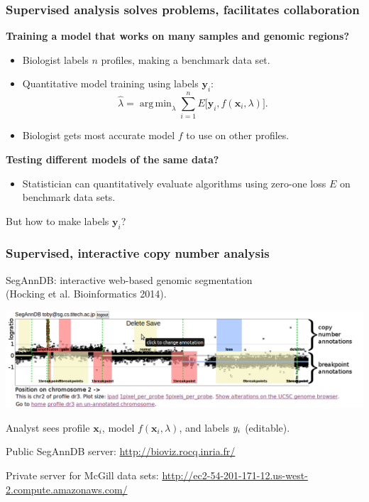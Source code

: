\documentclass{beamer}
\DeclareMathOperator*{\argmin}{arg\,min}
\begin{document}
\begin{frame}
  \frametitle{Supervised analysis solves problems, facilitates
    collaboration}
  \textbf{Training a model that works on many samples and genomic
    regions?} 
  \begin{itemize}
  \item Biologist labels $n$ profiles, making a benchmark data set.
  \item Quantitative model training using labels $\mathbf y_i$:
  \begin{equation*}
    \hat \lambda = \argmin_{\lambda}
    \sum_{i=1}^n
    E\big[
      \mathbf y_i,
      f(\mathbf x_i, \lambda)
    \big].
  \end{equation*}
  \item Biologist gets most accurate model $f$ to use on other profiles.
  \end{itemize}
  \textbf{Testing different models of the same data?} 
  \begin{itemize}
  \item Statistician can quantitatively evaluate algorithms using
    zero-one loss $E$ on benchmark data sets.
  \end{itemize}
  But how to make labels $\mathbf y_i$?
\end{frame}

\begin{frame}
  \frametitle{Supervised, interactive copy number analysis}

  SegAnnDB: interactive web-based genomic segmentation\\
  (Hocking et al. Bioinformatics 2014).
  \begin{center}
\includegraphics[width=\textwidth]{new-new-annotations}
  \end{center}
  Analyst sees profile $\mathbf x_i$, model $f(\mathbf x_i, \lambda)$,
  and labels $\mathbf \mathbf y_i$ (editable).

  \vskip 0.1in Public SegAnnDB
  server: \url{http://bioviz.rocq.inria.fr/}

\vskip 0.1in
Private server for McGill data sets:
\small
\url{http://ec2-54-201-171-12.us-west-2.compute.amazonaws.com/}

\end{frame}
\end{document}
